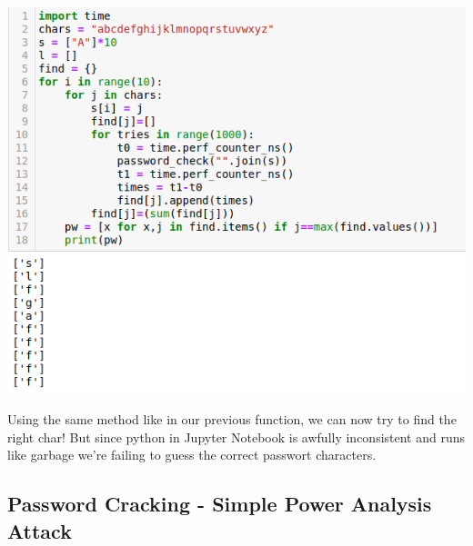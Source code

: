 \documentclass[a4paper,10pt]{article}
\begin{document}
\begin{center}
 \includegraphics[scale=0.5]{pw.png}
\end{center}
Using the same method like in our previous function, we can now try to find the right char! But since python in Jupyter Notebook is awfully inconsistent and runs like garbage we're failing to guess the correct passwort characters.
\subsection{Password Cracking - Simple Power Analysis Attack}
\end{document}
